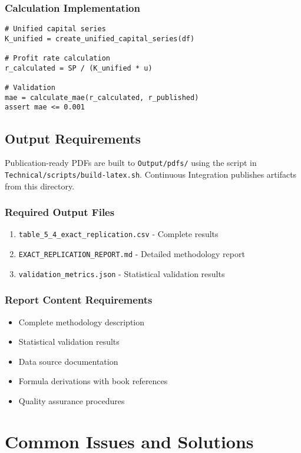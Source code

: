 \documentclass[12pt,a4paper]{article}
\begin{document}
\subsubsection{Calculation Implementation}
\begin{verbatim}
# Unified capital series
K_unified = create_unified_capital_series(df)

# Profit rate calculation
r_calculated = SP / (K_unified * u)

# Validation
mae = calculate_mae(r_calculated, r_published)
assert mae <= 0.001
\end{verbatim}

\subsection{Output Requirements}
Publication-ready PDFs are built to \texttt{Output/pdfs/} using the script in \texttt{Technical/scripts/build-latex.sh}. Continuous Integration publishes artifacts from this directory.

\subsubsection{Required Output Files}
\begin{enumerate}
    \item \texttt{table\_5\_4\_exact\_replication.csv} - Complete results
    \item \texttt{EXACT\_REPLICATION\_REPORT.md} - Detailed methodology report
    \item \texttt{validation\_metrics.json} - Statistical validation results
\end{enumerate}

\subsubsection{Report Content Requirements}
\begin{itemize}
    \item Complete methodology description
    \item Statistical validation results
    \item Data source documentation
    \item Formula derivations with book references
    \item Quality assurance procedures
\end{itemize}

\section{Common Issues and Solutions}
\end{document}
